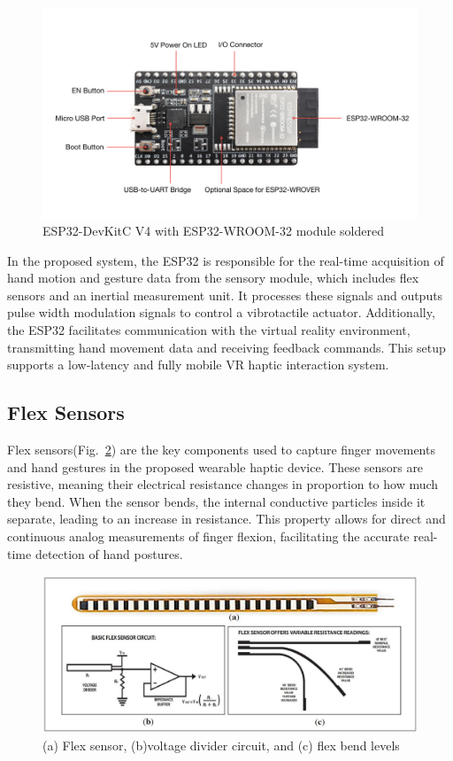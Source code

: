 \begin{figure}[H]\centering
	\includegraphics[width=1\textwidth]{Pictures/esp32.jpg}%
	\caption{ESP32-DevKitC V4 with ESP32-WROOM-32 module soldered~\cite{esp32docs}}\label{fig:esp32}%
\end{figure}

In the proposed system, the ESP32 is responsible for the real-time acquisition of hand motion and gesture data from the sensory module, which includes flex sensors and an inertial measurement unit. It processes these signals and outputs pulse width modulation signals to control a vibrotactile actuator. Additionally, the ESP32 facilitates communication with the virtual reality environment, transmitting hand movement data and receiving feedback commands. This setup supports a low-latency and fully mobile VR haptic interaction system.

\newpage
\subsection{Flex Sensors}
Flex sensors(Fig.~\ref{fig:flex_sensor}) are the key components used to capture finger movements and hand gestures in the proposed wearable haptic device. These sensors are resistive, meaning their electrical resistance changes in proportion to how much they bend. When the sensor bends, the internal conductive particles inside it separate, leading to an increase in resistance. This property allows for direct and continuous analog measurements of finger flexion, facilitating the accurate real-time detection of hand postures.

\begin{figure}[H]\centering
	\includegraphics[width=1\textwidth]{Pictures/flex_sensor.png}%
	\caption{(a) Flex sensor, (b)voltage divider circuit, and (c) flex bend levels~\cite{10.3390/s18072208}}\label{fig:flex_sensor}%
\end{figure}

